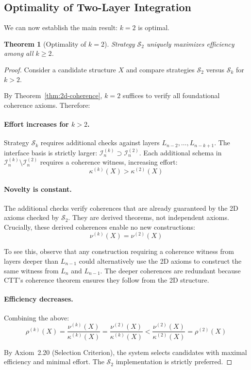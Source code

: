 \documentclass[11pt]{article}
\newtheorem{theorem}{Theorem}[section]
\theoremstyle{definition}
\theoremstyle{remark}
\begin{document}
\subsection{Optimality of Two-Layer Integration}

We can now establish the main result: $k = 2$ is optimal.

\begin{theorem}[Optimality of $k = 2$]
\label{thm:k2-optimal}
Strategy $\mathcal{S}_2$ uniquely maximizes efficiency among all $k \geq 2$.
\end{theorem}

\begin{proof}
Consider a candidate structure $X$ and compare strategies $\mathcal{S}_2$ versus $\mathcal{S}_k$ for $k > 2$.

By Theorem~\ref{thm:2d-coherence}, $k = 2$ suffices to verify all foundational coherence axioms.
Therefore:

\paragraph{Effort increases for $k > 2$.}
Strategy $\mathcal{S}_k$ requires additional checks against layers $L_{n-2}, \ldots, L_{n-k+1}$. The interface
basis is strictly larger: $\mathcal{I}_n^{(k)} \supset \mathcal{I}_n^{(2)}$. Each additional schema in $\mathcal{I}_n^{(k)} \setminus \mathcal{I}_n^{(2)}$
requires a coherence witness, increasing effort:
\[
\kappa^{(k)}(X) > \kappa^{(2)}(X)
\]

\paragraph{Novelty is constant.}
The additional checks verify coherences that are already guaranteed by the 2D axioms checked by
$\mathcal{S}_2$. They are derived theorems, not independent axioms. Crucially, these derived coherences
enable no new constructions:
\[
\nu^{(k)}(X) = \nu^{(2)}(X)
\]

To see this, observe that any construction requiring a coherence witness from layers deeper than
$L_{n-1}$ could alternatively use the 2D axioms to construct the same witness from $L_n$ and $L_{n-1}$.
The deeper coherences are redundant because CTT's coherence theorem ensures they follow from the
2D structure.

\paragraph{Efficiency decreases.}
Combining the above:
\[
\rho^{(k)}(X) = \frac{\nu^{(k)}(X)}{\kappa^{(k)}(X)} = \frac{\nu^{(2)}(X)}{\kappa^{(k)}(X)} < \frac{\nu^{(2)}(X)}{\kappa^{(2)}(X)} = \rho^{(2)}(X)
\]

By Axiom~2.20 (Selection Criterion), the system selects candidates with maximal efficiency
and minimal effort. The $\mathcal{S}_2$ implementation is strictly preferred.
\end{proof}
\end{document}
